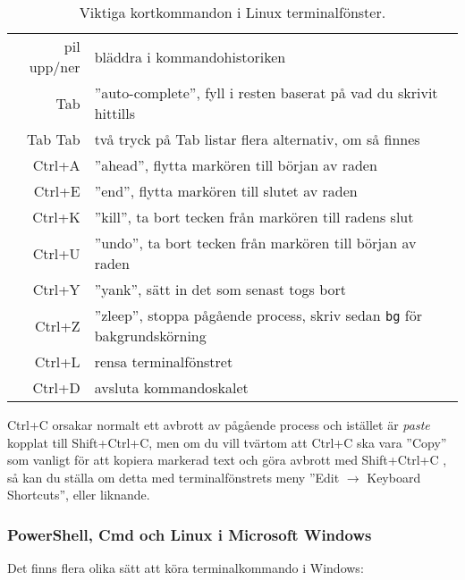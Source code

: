\begin{table}[H]
\renewcommand{\arraystretch}{1.15}
\begin{tabular}{@{}r | l}
pil upp/ner & bläddra i kommandohistoriken \\
Tab & ''auto-complete'', fyll i resten baserat på vad du skrivit hittills \\
Tab Tab & två tryck på Tab listar flera alternativ, om så finnes \\
Ctrl+A & ''ahead'', flytta markören till början av raden \\
Ctrl+E & ''end'', flytta markören till slutet av raden \\
Ctrl+K & ''kill'', ta bort tecken från markören till radens slut\\
Ctrl+U & ''undo'', ta bort tecken från markören till början av raden \\
Ctrl+Y & ''yank'', sätt in det som senast togs bort\\
Ctrl+Z & ''zleep'', stoppa pågående process, skriv sedan \texttt{bg} för bakgrundskörning\\
Ctrl+L & rensa terminalfönstret\\
Ctrl+D & avsluta kommandoskalet \\
\end{tabular}
    \caption{Viktiga kortkommandon i Linux terminalfönster.}
    \label{fig:terminal:shortcuts}
\end{table}

\noindent Ctrl+C orsakar normalt ett avbrott av pågående process och istället är \emph{paste} kopplat till Shift+Ctrl+C, men om du vill tvärtom att Ctrl+C ska vara ''Copy'' som vanligt för att kopiera markerad text och göra avbrott med Shift+Ctrl+C , så kan du ställa om detta med terminalfönstrets meny ''Edit $\rightarrow$ Keyboard Shortcuts'', eller liknande.



\subsubsection{PowerShell, Cmd och Linux i Microsoft Windows}
Det finns flera olika sätt att köra terminalkommando i Windows:


